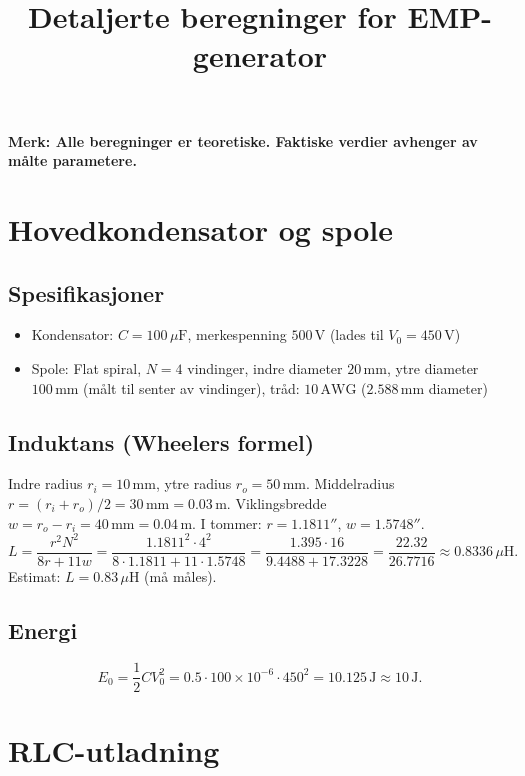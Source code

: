 \documentclass{article}
\title{Detaljerte beregninger for EMP-generator}
\author{}
\date{}
\begin{document}
\maketitle

\textbf{Merk: Alle beregninger er teoretiske. Faktiske verdier avhenger av målte parametere.}

\section{Hovedkondensator og spole}

\subsection{Spesifikasjoner}
\begin{itemize}
\item Kondensator: $C = 100\,\mu\text{F}$, merkespenning $500\,\text{V}$ (lades til $V_0 = 450\,\text{V}$)
\item Spole: Flat spiral, $N = 4$ vindinger, indre diameter $20\,\text{mm}$, ytre diameter $100\,\text{mm}$ (målt til senter av vindinger), tråd: $10\,\text{AWG}$ ($2.588\,\text{mm}$ diameter)
\end{itemize}

\subsection{Induktans (Wheelers formel)}
Indre radius $r_i = 10\,\text{mm}$, ytre radius $r_o = 50\,\text{mm}$.
Middelradius $r = (r_i + r_o)/2 = 30\,\text{mm} = 0.03\,\text{m}$.
Viklingsbredde $w = r_o - r_i = 40\,\text{mm} = 0.04\,\text{m}$.
I tommer: $r = 1.1811''$, $w = 1.5748''$.
\begin{equation}
L = \frac{r^2 N^2}{8r + 11w} = \frac{1.1811^2 \cdot 4^2}{8 \cdot 1.1811 + 11 \cdot 1.5748} = \frac{1.395 \cdot 16}{9.4488 + 17.3228} = \frac{22.32}{26.7716} \approx 0.8336\,\mu\text{H}.
\end{equation}
Estimat: $L = 0.83\,\mu\text{H}$ (må måles).

\subsection{Energi}
\begin{equation}
E_0 = \frac{1}{2} C V_0^2 = 0.5 \cdot 100 \times 10^{-6} \cdot 450^2 = 10.125\,\text{J} \approx 10\,\text{J}.
\end{equation}

\section{RLC-utladning}
\end{document}
